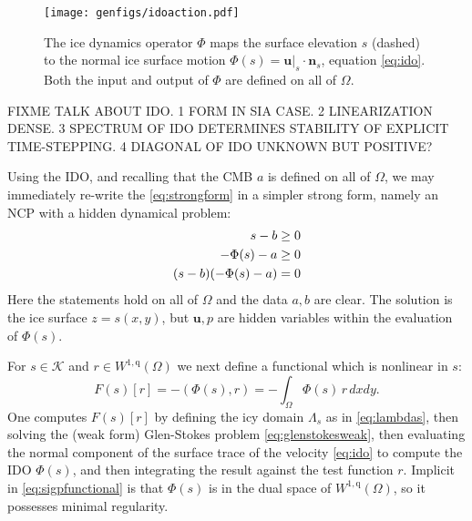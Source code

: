 \documentclass[letterpaper,final,12pt,reqno]{amsart}
\theoremstyle{claim}
\newcommand{\bn}{\mathbf{n}}
\newcommand{\bu}{\mathbf{u}}
\newcommand{\ip}[2]{\left(#1,#2\right)}
\newcommand{\qq}{{\text{q}}}
\numberwithin{equation}{section}
\numberwithin{figure}{section}
\numberwithin{table}{section}
\numberwithin{theorem}{section}
\begin{document}
\begin{figure}[t]
\begin{center}
\texttt{[image: genfigs/idoaction.pdf]}
\end{center}
\caption{The ice dynamics operator $\Phi$ maps the surface elevation $s$ (dashed) to the normal ice surface motion $\Phi(s)=\bu|_s \cdot \bn_s$, equation \eqref{eq:ido}.  Both the input and output of $\Phi$ are defined on all of $\Omega$.}
\label{fig:idoaction}
\end{figure}

FIXME TALK ABOUT IDO.  1 FORM IN SIA CASE. 2 LINEARIZATION DENSE.  3 SPECTRUM OF IDO DETERMINES STABILITY OF EXPLICIT TIME-STEPPING. 4 DIAGONAL OF IDO UNKNOWN BUT POSITIVE?

Using the IDO, and recalling that the CMB $a$ is defined on all of $\Omega$, we may immediately re-write the \eqref{eq:strongform} in a simpler strong form, namely an NCP with a hidden dynamical problem:
\begin{align}
s - b &\ge 0  \label{eq:idostrongform} \\
- \Phi(s) - a &\ge 0 \notag \\
(s - b) (- \Phi(s) - a) &= 0 \notag
\end{align}
Here the statements hold on all of $\Omega$ and the data $a,b$ are clear.  The solution is the ice surface $z=s(x,y)$, but $\bu,p$ are hidden variables within the evaluation of $\Phi(s)$.

For $s \in \mathcal{K}$ and $r \in W^{1,\qq}(\Omega)$ we next define a functional which is nonlinear in $s$:
\begin{equation}
F(s)[r] = - \ip{\Phi(s)}{r} = - \int_\Omega \Phi(s)\, r \,dx dy. \label{eq:sigpfunctional}
\end{equation}
One computes $F(s)[r]$ by defining the icy domain $\Lambda_s$ as in \eqref{eq:lambdas}, then solving the (weak form) Glen-Stokes problem \eqref{eq:glenstokesweak}, then evaluating the normal component of the surface trace of the velocity \eqref{eq:ido} to compute the IDO $\Phi(s)$, and then integrating the result against the test function $r$.  Implicit in \eqref{eq:sigpfunctional} is that $\Phi(s)$ is in the dual space of $W^{1,\qq}(\Omega)$, so it possesses minimal regularity.
\end{document}
